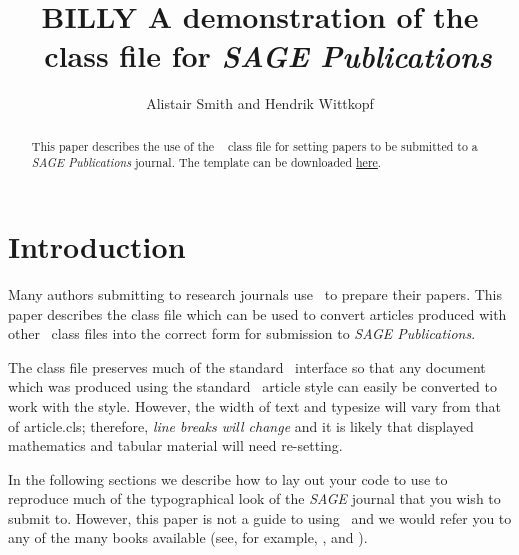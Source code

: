 \documentclass[Afour,sageh,times]{sagej}
\begin{document}

\title{BILLY A demonstration of the \LaTeXe\ class file for
\itshape{SAGE Publications}}

\author{Alistair Smith and Hendrik Wittkopf}




\begin{abstract}
This paper describes the use of the \LaTeXe\
\textsf{\journalclass} class file for setting papers to be
submitted to a \textit{SAGE Publications} journal.
The template can be downloaded \href{http://www.uk.sagepub.com/repository/binaries/SAGE LaTeX template.zip}{here}.
\end{abstract}


\maketitle

\section{Introduction}
Many authors submitting to research journals use \LaTeXe\ to
prepare their papers. This paper describes the
\textsf{\journalclass} class file which can be used to convert
articles produced with other \LaTeXe\ class files into the correct
form for submission to \textit{SAGE Publications}.

The \textsf{\journalclass} class file preserves much of the
standard \LaTeXe\ interface so that any document which was
produced using the standard \LaTeXe\ \textsf{article} style can
easily be converted to work with the \textsf{\journalclassshort}
style. However, the width of text and typesize will vary from that
of \textsf{article.cls}; therefore, \textit{line breaks will change}
and it is likely that displayed mathematics and tabular material
will need re-setting.

In the following sections we describe how to lay out your code to
use \textsf{\journalclass} to reproduce much of the typographical look of
the \textit{SAGE} journal that you wish to submit to. However, this paper is not a guide to
using \LaTeXe\ and we would refer you to any of the many books
available (see, for example, \cite{R1}, \cite{R2} and \cite{R3}).
\end{document}

